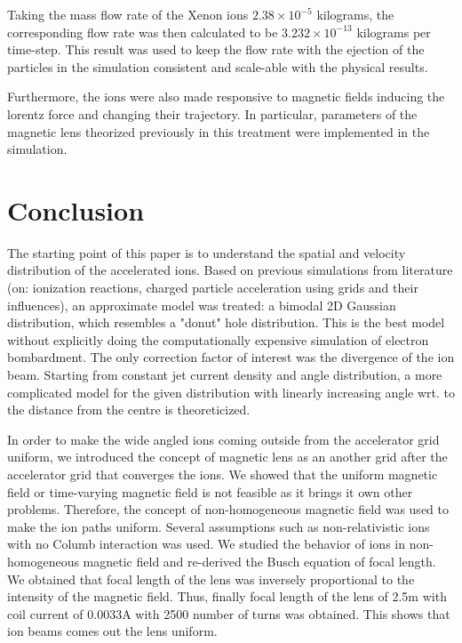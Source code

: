 \documentclass[twocolumn,12pt]{article}
\numberwithin{equation}{section} %
\numberwithin{equation}{section}
\begin{document}
Taking the mass flow rate of the Xenon ions $2.38 \times 10^{-5}$ kilograms, the corresponding flow rate was then calculated to be $3.232 \times 10^{-13}$ kilograms per time-step. This result was used to keep the flow rate with the ejection of the particles in the simulation consistent and scale-able with the physical results. 

Furthermore, the ions were also made responsive to magnetic fields inducing the lorentz force and changing their trajectory. In particular, parameters of the magnetic lens theorized previously in this treatment were implemented in the simulation. 




\section{Conclusion}
\label{sectionconclusion}
The starting point of this paper is to understand the spatial and velocity distribution of the accelerated ions. Based on previous simulations from literature (on: ionization reactions, charged particle acceleration using grids and their influences), an approximate model was treated: a bimodal 2D Gaussian distribution, which resembles a "donut" hole distribution. This is the best model without explicitly doing the computationally expensive simulation of electron bombardment. The only correction factor of interest was the divergence of the ion beam. Starting from constant jet current density and angle distribution, a more complicated model for the given distribution with linearly increasing angle wrt. to the distance from the centre is theoreticized. 

In order to make the wide angled ions coming outside from the accelerator grid uniform, we introduced the concept of magnetic lens as an another grid after the accelerator grid that converges the ions. We showed that the uniform magnetic field or time-varying magnetic field is not feasible as it brings it own other problems.  Therefore, the concept of non-homogeneous magnetic field was used to make the ion paths uniform. Several assumptions such as non-relativistic ions with no Columb interaction was used. We studied the behavior of ions in non-homogeneous magnetic field and re-derived the Busch equation of focal length. We obtained that focal length of the lens was inversely proportional to the intensity of the magnetic field. Thus, finally focal length of the lens of 2.5m with coil current of 0.0033A with 2500 number of turns was obtained. This shows that ion beams comes out the lens uniform. 
\end{document}
